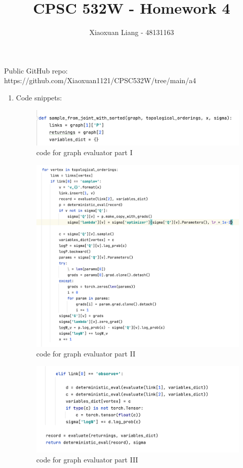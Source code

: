 \documentclass{article}
\title{ \normalfont \normalsize 
\huge CPSC 532W - Homework 4}
\date{}
\author{Xiaoxuan Liang - 48131163}
\begin{document}
\maketitle

Public GitHub repo: https://github.com/Xiaoxuan1121/CPSC532W/tree/main/a4
\begin{enumerate}
\item Code snippets:

\begin{figure}[!ht]
	\centering
	\includegraphics[scale=0.5]{../figs/graph_evaluator_1}
	\caption{code for graph evaluator part I}
\end{figure}

\begin{figure}[!ht]
	\centering
	\includegraphics[scale=0.5]{../figs/graph_evaluator_2}
	\caption{code for graph evaluator part II}
\end{figure}

\newpage
\begin{figure}[!ht]
	\centering
	\includegraphics[scale=0.5]{../figs/graph_evaluator_3}
	\caption{code for graph evaluator part III}
\end{figure}


\end{enumerate}
\end{document}
